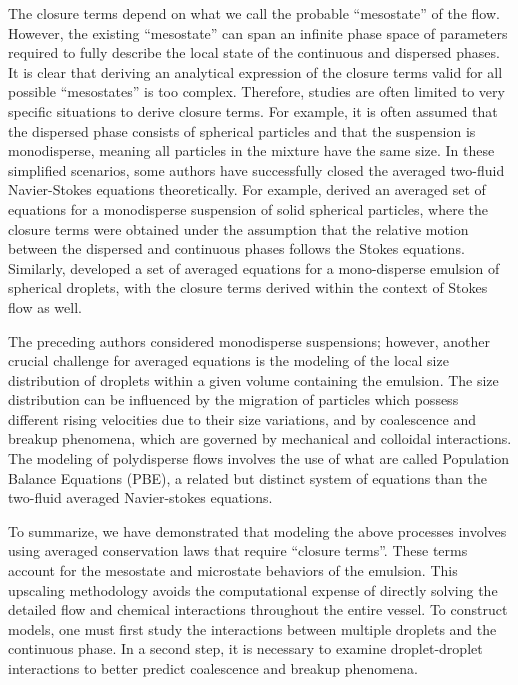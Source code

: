 The closure terms depend on what we call the probable ``mesostate'' of the flow. 
However, the existing ``mesostate'' can span an infinite phase space of parameters required to fully describe the local state of the continuous and dispersed phases.
It is clear that deriving an analytical expression of the closure terms valid for all possible ``mesostates'' is too complex.
Therefore, studies are often limited to very specific situations to derive closure terms.
For example, it is often assumed that the dispersed phase consists of spherical particles and that the suspension is monodisperse, meaning all particles in the mixture have the same size.
In these simplified scenarios, some authors have successfully closed the averaged two-fluid Navier-Stokes equations theoretically.
For example, \citet{jackson1997locally} derived an averaged set of equations for a monodisperse suspension of solid spherical particles, where the closure terms were obtained under the assumption that the relative motion between the dispersed and continuous phases follows the Stokes equations. 
Similarly, \citet{zhang1997momentum} developed a set of averaged equations for a mono-disperse emulsion of spherical droplets, with the closure terms derived within the context of Stokes flow as well.


The preceding authors considered monodisperse suspensions; however, another crucial challenge for averaged equations is the modeling of the local size distribution of droplets within a given volume containing the emulsion.
The size distribution can be influenced by the migration of particles which possess different rising velocities due to their size variations, and by coalescence and breakup phenomena, which are governed by mechanical and colloidal interactions.
The modeling of polydisperse flows involves the use of what are called Population Balance Equations (PBE), a related but distinct system of equations than the two-fluid averaged Navier-stokes equations.


To summarize, we have demonstrated that modeling the above processes involves using averaged conservation laws that require ``closure terms''. 
These terms account for the mesostate and microstate behaviors of the emulsion. 
This upscaling methodology avoids the computational expense of directly solving the detailed flow and chemical interactions throughout the entire vessel.
To construct models, one must first study the interactions between multiple droplets and the continuous phase. 
In a second step, it is necessary to examine droplet-droplet interactions to better predict coalescence and breakup phenomena. %

